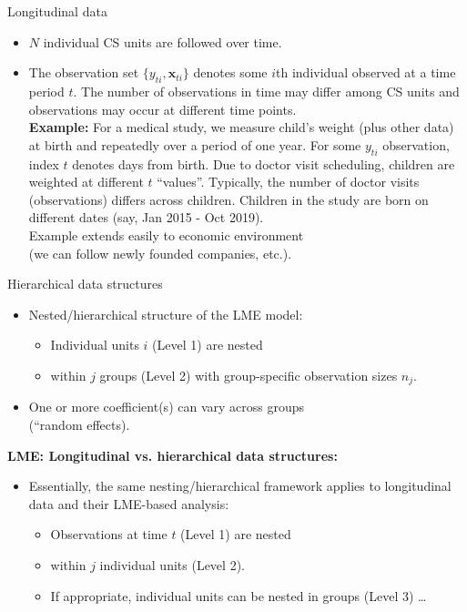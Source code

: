 \documentclass{beamer}
\begin{document}
\begin{frame}{Longitudinal data}
\begin{itemize}
\item $N$ individual CS units are followed over time.
\medskip
\item The observation set $\{y_{ti},\bm{x}_{ti}\}$ denotes some $i$th individual  observed at a time period $t$. The number of observations in time may differ among CS units and observations may occur at different time points. \\ \medskip 
\textbf{Example:} For a medical study, we measure child's weight (plus other data) at birth and repeatedly over a period of one year. For some $y_{ti}$ observation, index $t$ denotes days from birth. Due to doctor visit scheduling, children are weighted at different $t$ ``values''. Typically, the number of doctor visits (observations) differs across children. Children in the study are born on different dates (say, Jan 2015 - Oct 2019). \\ \medskip Example extends easily to economic environment \\(we can follow newly founded companies, etc.).
\end{itemize}
\end{frame}
\begin{frame}{Hierarchical data structures}
\begin{itemize}
\item Nested/hierarchical structure of the LME model:
\medskip
\begin{itemize}
    \item Individual units $i$ (Level 1) are nested
    \medskip
    \item within $j$ groups (Level 2) with group-specific observation sizes $n_j$.
\end{itemize}
\medskip
\item One or more coefficient(s) can vary across groups \\(``random effects).
\end{itemize}
\bigskip
\textbf{LME: Longitudinal vs. hierarchical data structures:}
\medskip
\begin{itemize}
\item Essentially, the same nesting/hierarchical framework applies to longitudinal data and their LME-based analysis:
\medskip
\begin{itemize}
    \item Observations at time $t$ (Level 1) are nested
    \smallskip
    \item within $j$ individual units (Level 2).
    \smallskip
    \item If appropriate, individual units can be nested in groups (Level 3) \dots 
\end{itemize}
\end{itemize}
\end{frame}
\end{document}
